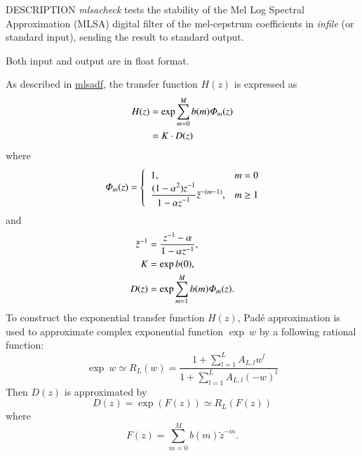 \begin{synopsis}
\item [mlsacheck] [ --m $M$ ] [ --a $A$ ] [ --r ] [ --R ]
 [--P $Pa$ ] [ {\em infile} ]
\end{synopsis}

\begin{qsection}{DESCRIPTION}
 {\em mlsacheck} tests the stability of
 the Mel Log Spectral Approximation (MLSA) digital filter
 of the mel-cepstrum coefficients in {\em infile} (or standard input),
 sending the result to standard output.

 Both input and output are in float format.

 As described in \hyperlink{mlsadf}{mlsadf},
 the transfer function $H(z)$ is expressed as
\begin{align}
H(z) &= \exp \sum_{m=0}^M b(m) {\it\Phi}_m(z) \notag \\
     &= K \cdot D(z)\notag
\end{align}
where
\begin{displaymath}
{\it\Phi}_m(z) = \begin{cases}
	  \;\;1, & m=0 \\ \;\;\displaystyle
	  \frac{\displaystyle (1-\alpha^2)z^{-1}}
	    {\displaystyle 1-\alpha z^{-1}}
	    \tilde{z}^{-(m-1)},& m\geq 1
	\end{cases}
\end{displaymath}
and
\begin{align}
\tilde{z}^{-1} &= \frac{z^{-1}-\alpha}{1-\alpha z^{-1}}, \notag \\
K    &= \exp b(0) \notag, \\
D(z) &= \exp \sum_{m=1}^M b(m) {\it\Phi}_m(z).  \notag
\end{align}
To construct the exponential transfer function $H(z)$,
 Pad\'e approximation is used to approximate complex exponential function
 $\exp\:w$
 by a following rational function:
  \begin{displaymath}
   \exp\:w \simeq  R_L(w) = \frac{1+\sum_{l=1}^{L}A_{L,l}w^{l}}{1+\sum_{l=1}^{L}A_{L,l}(-w)^{l}}
  \end{displaymath}
 Then $D(z)$ is approximated by
  \begin{displaymath}
   D(z) = \exp(F(z)) \simeq R_{L}(F(z))
  \end{displaymath}
 where
  \begin{displaymath}
   F(z) = \sum_{m=0}^{M}b(m)\tilde{z}^{-m}.
  \end{displaymath}


\end{qsection}
